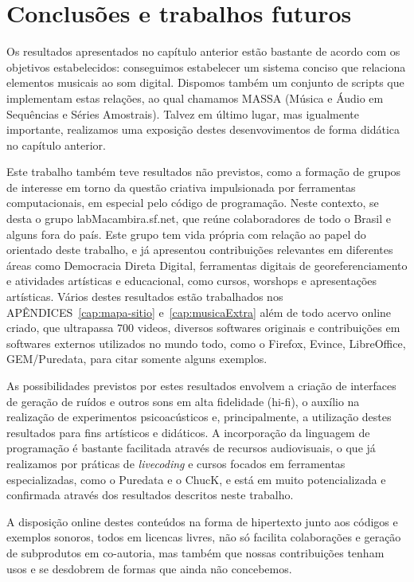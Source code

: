 \chapter{Conclusões e trabalhos futuros} %
\label{cap:conclusao}

Os resultados apresentados no capítulo anterior estão bastante de acordo
com os objetivos estabelecidos: conseguimos estabelecer um sistema conciso
que relaciona elementos musicais ao som digital. Dispomos também um conjunto
de scripts que implementam estas relações, ao qual chamamos MASSA (Música
e Áudio em Sequências e Séries Amostrais). Talvez em último lugar, mas igualmente
importante, realizamos uma exposição destes desenvovimentos de forma didática no
capítulo anterior.

Este trabalho também teve resultados não previstos, como a formação de grupos
de interesse em torno da questão criativa impulsionada por ferramentas computacionais,
em especial pelo código de programação. Neste contexto, se desta o grupo
labMacambira.sf.net, que reúne colaboradores de todo o Brasil e alguns fora do país.
Este grupo tem vida própria com relação ao papel do orientado
deste trabalho, e já apresentou contribuições relevantes em diferentes áreas
como Democracia Direta Digital, ferramentas digitais de georeferenciamento e
atividades artísticas e educacional, como cursos, worshops e apresentações artísticas. Vários destes resultados estão trabalhados nos APÊNDICES~\ref{cap:mapa-sitio} e~\ref{cap:musicaExtra} além de todo acervo online criado, que ultrapassa 700 videos, diversos softwares originais e contribuições em softwares externos utilizados no mundo todo, como o Firefox, Evince, LibreOffice, GEM/Puredata, para citar somente alguns exemplos.

As possibilidades previstos por estes resultados envolvem a criação de interfaces de geração de ruídos e outros sons em alta fidelidade (hi-fi), o auxílio na realização de experimentos psicoacústicos e, principalmente, a utilização destes resultados para fins artísticos e didáticos. A incorporação da linguagem de programação é bastante facilitada através de recursos audiovisuais, o que já realizamos por práticas de \emph{livecoding} e cursos focados em ferramentas especializadas, como o Puredata e o ChucK, e está em muito potencializada e confirmada através dos resultados descritos neste trabalho.

A disposição online destes conteúdos na forma de hipertexto junto aos códigos e exemplos sonoros, todos em licencas livres, não só facilita colaborações e geração de subprodutos em co-autoria, mas também que nossas contribuições tenham usos e se desdobrem de formas que ainda não concebemos.








